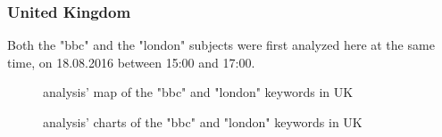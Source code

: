 \documentclass[a4paper,11pt]{report}
\begin{document}
\subsubsection{United Kingdom}
Both the "bbc" and the "london" subjects were first analyzed here at the same time, on 18.08.2016 between 15:00 and 17:00.
\begin{figure}[H]
\vspace{-5pt}
\begin{center}
\vspace{-5pt}
\caption{analysis' map of the "bbc" and "london" keywords in UK}
\end{center}
\end{figure}
\vspace{-10pt}

\begin{figure}[H]
\vspace{-5pt}
\begin{center}
\vspace{-5pt}
\caption{analysis' charts of the "bbc" and "london" keywords in UK}
\end{center}
\end{figure}
\vspace{-10pt}
\end{document}
